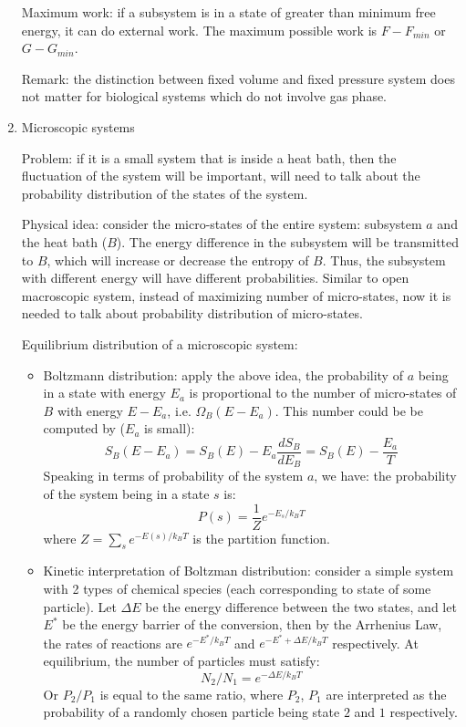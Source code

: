 \documentclass{report}
\begin{document}
\begin{enumerate}
Maximum work: if a subsystem is in a state of greater than minimum free energy, it can do external work. The maximum possible work is $F - F_{min}$ or $G - G_{min}$. 

Remark: the distinction between fixed volume and fixed pressure system does not matter for biological systems which do not involve gas phase. 

\item{Microscopic systems}
\label{sec:Boltzmann-distr}

Problem: if it is a small system that is inside a heat bath, then the fluctuation of the system will be important, will need to talk about the probability distribution of the states of the system. 

Physical idea: consider the micro-states of the entire system: subsystem $a$ and the heat bath ($B$). The energy difference in the subsystem will be transmitted to $B$, which will increase or decrease the entropy of $B$. Thus, the subsystem with different energy will have different probabilities. Similar to open macroscopic system, instead of maximizing number of micro-states, now it is needed to talk about probability distribution of micro-states.  

Equilibrium distribution of a microscopic system: 
\begin{itemize}
\item Boltzmann distribution: apply the above idea, the probability of $a$ being in a state with energy $E_a$ is proportional to the number of micro-states of $B$ with energy $E - E_a$, i.e. $\Omega_B(E - E_a)$. This number could be be computed by ($E_a$ is small):
\begin{equation}
S_B(E - E_a) = S_B(E) - E_a \frac{dS_B}{dE_B} = S_B(E) - \frac{E_a}{T}
\end{equation}
Speaking in terms of probability of the system $a$, we have: the probability of the system being in a state $s$ is: 
\begin{equation}
P(s) = \frac{1}{Z} e^{-E_s/k_B T}
\end{equation}
where $Z = \sum_{s}{e^{-E(s)/k_B T}}$ is the partition function. 

\item Kinetic interpretation of Boltzman distribution: consider a simple system with 2 types of chemical species (each corresponding to state of some particle). Let $\Delta E$ be the energy difference between the two states, and let $E^*$ be the energy barrier of the conversion, then by the Arrhenius Law, the rates of reactions are $e^{-E^* / k_B T}$ and $e^{ -E^* + \Delta E/k_B T}$ respectively. At equilibrium, the number of particles must satisfy: 
\begin{equation}
N_2 / N_1 = e^{-\Delta E/k_B T}
\end{equation}
Or $P_2 / P_1$ is equal to the same ratio, where $P_2$, $P_1$ are interpreted as the probability of a randomly chosen particle being state $2$ and $1$ respectively. 
\end{itemize}


\end{enumerate}
\end{document}
